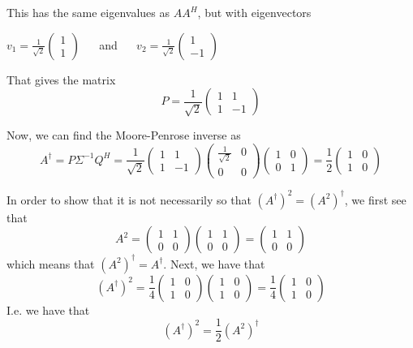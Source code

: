 \documentclass[a4paper,11pt]{article}
\begin{document}
This has the same eigenvalues as $AA^H$, but with eigenvectors
\begin{center}
    $v_1 = \frac{1}{\sqrt{2}}\begin{pmatrix}1 \\ 1\end{pmatrix}\:\:\:\:\:\:$ and $\:\:\:\:\:\:v_2 = \frac{1}{\sqrt{2}}\begin{pmatrix}1 \\ -1\end{pmatrix}$
\end{center}
That gives the matrix 
\[
    P = \frac{1}{\sqrt{2}}\begin{pmatrix}
        1 &  1 \\
        1 & -1
    \end{pmatrix}
\]

Now, we can find the Moore-Penrose inverse as
\[
    A^{\dagger} = P\Sigma^{-1}Q^{H} 
                = \frac{1}{\sqrt{2}} \begin{pmatrix}1&1\\1&-1\end{pmatrix} 
                                     \begin{pmatrix}\frac{1}{\sqrt{2}} & 0 \\ 0 & 0\end{pmatrix}
                                     \begin{pmatrix}1 & 0 \\ 0 & 1\end{pmatrix}
                = \frac{1}{2}\begin{pmatrix}1 & 0 \\ 1 & 0\end{pmatrix}
\]

In order to show that it is not necessarily so that $(A^{\dagger})^2 = (A^2)^{\dagger}$, we first see that
\[
    A^2 = \begin{pmatrix} 1 & 1 \\ 0 & 0 \end{pmatrix} \begin{pmatrix} 1 & 1 \\ 0 & 0 \end{pmatrix} = \begin{pmatrix} 1 & 1 \\ 0 & 0 \end{pmatrix}
\]
which means that $(A^2)^{\dagger} = A^{\dagger}$. Next, we have that 
\[
    (A^\dagger)^2 = \frac{1}{4} \begin{pmatrix} 1 & 0 \\ 1 & 0\end{pmatrix} \begin{pmatrix} 1 & 0 \\ 1 & 0\end{pmatrix} = \frac{1}{4}\begin{pmatrix} 1 & 0 \\ 1 & 0\end{pmatrix}
\]
I.e. we have that 
\[
    (A^\dagger)^2 = \frac{1}{2} (A^2)^\dagger
\]
\end{document}
